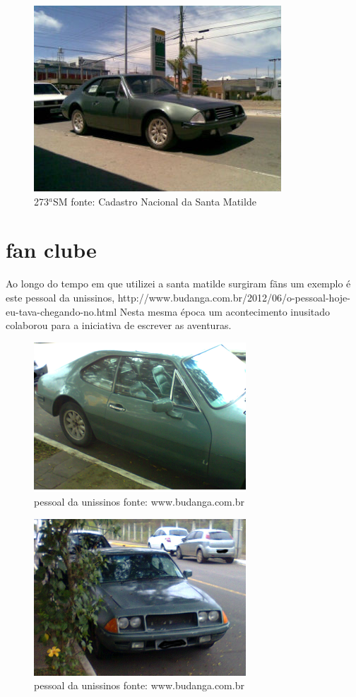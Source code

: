 \documentclass[a4paper]{report}
\begin{document}
\begin{figure}[!htb]
\centering
\includegraphics{sm273}
\caption{273$^{a}$SM fonte: Cadastro Nacional da Santa Matilde}
\label{a 273a SM}
\end{figure}
\clearpage

\section*{fan clube}
Ao longo do tempo em que utilizei a santa matilde surgiram f\~ans um exemplo \'e este pessoal da unissinos, http://www.budanga.com.br/2012/06/o-pessoal-hoje-eu-tava-chegando-no.html 
Nesta mesma \'epoca um acontecimento inusitado colaborou para a iniciativa de escrever as aventuras.

\begin{figure}[!htb]
\centering
\includegraphics{Foto0296}
\caption{pessoal da unissinos fonte: www.budanga.com.br}
\label{fan clube de S\~ao Leopoldo}
\end{figure}

\begin{figure}[!htb]
\centering
\includegraphics{Foto0295}
\caption{pessoal da unissinos fonte: www.budanga.com.br}
\label{Blog do pessoal da Tecnosinos }
\end{figure}
\clearpage
\end{document}
